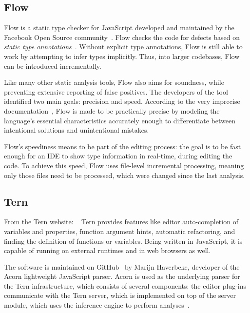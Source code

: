 \subsection{Flow}

Flow is a static type checker for JavaScript developed and maintained by the Facebook Open Source community~\cite{flow-github}. Flow checks the code for defects based on \emph{static type annotations}~\cite{flow-website}. Without explicit type annotations, Flow is still able to work by attempting to infer types implicitly. Thus, into larger codebases, Flow can be introduced incrementally.

Like many other static analysis tools, Flow also aims for soundness, while preventing extensive reporting of false positives. The developers of the tool identified two main goals: precision and speed. According to the very imprecise documentation~\cite{flow-docs}, Flow is made to be practically precise by modeling the language's essential characteristics accurately enough to differentiate between intentional solutions and unintentional mistakes.

Flow's speediness means to be part of the editing process: the goal is to be fast enough for an IDE to show type information in real-time, during editing the code. To achieve this speed, Flow uses file-level incremental processing, meaning only those files need to be processed, which were changed since the last analysis.

\subsection{Tern}

From the Tern website: ~\cite{tern-website} Tern provides features like editor auto-completion of variables and properties, function argument hints, automatic refactoring, and finding the definition of functions or variables. Being written in JavaScript, it is capable of running on external runtimes and in web browsers as well.

The software is maintained on GitHub~\cite{tern-github} by Marijn Haverbeke, developer of the Acorn lightweight JavaScript parser. Acorn is used as the underlying parser for the Tern infrastructure, which consists of several components: the editor plug-ins communicate with the Tern server, which is implemented on top of the server module, which uses the inference engine to perform analyses~\cite{tern-website}.

